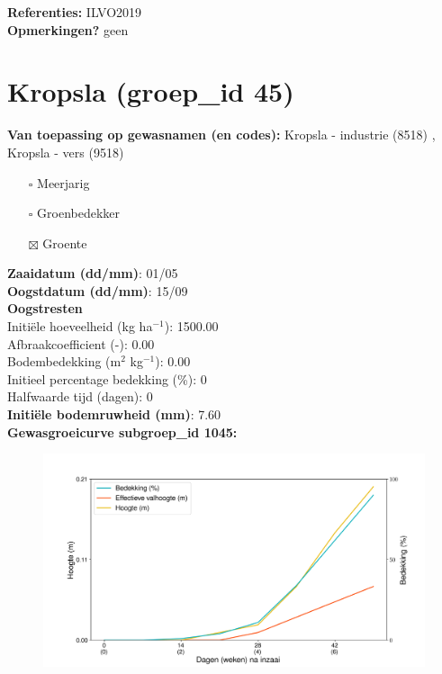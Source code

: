 \documentclass{article}
\begin{document}
  \textbf{Referenties:} ILVO2019 \vspace{0.10cm} \\ 
  \textbf{Opmerkingen?} geen \vspace{0.10cm} \\ 
 \newpage 
 \section{Kropsla (groep\_id 45)} 
 \textbf{Van toepassing op gewasnamen (en codes):} Kropsla - industrie (8518) , Kropsla - vers (9518) 
 \begin{multicols}{3} \begin{itemize} \item[$\square$] Meerjarig \item[$\square$] Groenbedekker \item[$\boxtimes$] Groente \end{itemize} \end{multicols} 
  \textbf{Zaaidatum (dd/mm)}: 01/05  \vspace{0.10cm} \\ 
  \textbf{Oogstdatum (dd/mm)}: 15/09  \vspace{0.10cm} \\ 
  \textbf{Oogstresten} \vspace{0.05cm} \\ 
  \tab Initi\"{e}le hoeveelheid (kg ha$^{-1}$): 1500.00 \vspace{0.05cm} \\ 
  \tab Afbraakcoefficient (-): 0.00 \vspace{0.05cm} \\ 
  \tab Bodembedekking (m$^2$ kg$^{-1}$): 0.00 \vspace{0.05cm} \\ 
  \tab Initieel percentage bedekking (\%): 0 \vspace{0.05cm} \\ 
  \tab Halfwaarde tijd (dagen): 0 \vspace{0.05cm} \\ 
  \textbf{Initi\"{e}le bodemruwheid (mm)}: 7.60 \vspace{0.05cm} \\ 
  \textbf{Gewasgroeicurve subgroep\_id 1045:} 
 \begin{center} \begin{figure}[H] \includegraphics[width=12.5cm]{temp/1045.png} \end{figure} \end{center} 
\end{document}
